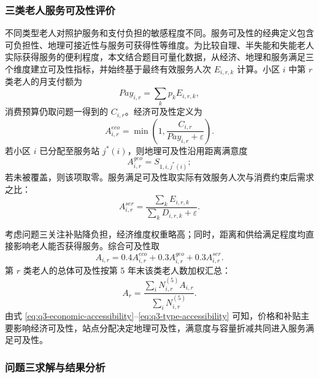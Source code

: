 \subsubsection{三类老人服务可及性评价}

不同类型老人对照护服务和支付负担的敏感程度不同。服务可及性的经典定义包含可负担性、地理可接近性与服务可获得性等维度\cite{penchansky1981}。为比较自理、半失能和失能老人实际获得服务的便利程度，本文结合题目可量化数据，从经济、地理和服务满足三个维度建立可及性指标，并始终基于最终有效服务人次 $E_{i,r,k}$ 计算。小区 $i$ 中第 $r$ 类老人的月支付额为
\begin{equation}
  Pay_{i,r}
  =
  \sum_kp_kE_{i,r,k},
  \label{eq:q3-monthly-pay}
\end{equation}
消费预算仍取问题一得到的 $C_{i,r}$。经济可及性定义为
\begin{equation}
  A_{i,r}^{eco}
  =
  \min\left(
    1,\frac{C_{i,r}}{Pay_{i,r}+\varepsilon}
  \right).
  \label{eq:q3-economic-accessibility}
\end{equation}
若小区 $i$ 已分配至服务站 $j^*(i)$，则地理可及性沿用距离满意度
\begin{equation}
  A_{i,r}^{geo}=S_{1,i,j^*(i)};
  \label{eq:q3-geographic-accessibility}
\end{equation}
若未被覆盖，则该项取零。服务满足可及性取实际有效服务人次与消费约束后需求之比：
\begin{equation}
  A_{i,r}^{ser}
  =
  \frac{\sum_kE_{i,r,k}}
  {\sum_kD_{i,r,k}+\varepsilon}.
  \label{eq:q3-service-accessibility}
\end{equation}

考虑问题三关注补贴降负担，经济维度权重略高；同时，距离和供给满足程度均直接影响老人能否获得服务。综合可及性取
\begin{equation}
  A_{i,r}
  =
  0.4A_{i,r}^{eco}
  +0.3A_{i,r}^{geo}
  +0.3A_{i,r}^{ser}.
  \label{eq:q3-overall-accessibility}
\end{equation}
第 $r$ 类老人的总体可及性按第 5 年末该类老人数加权汇总：
\begin{equation}
  A_r
  =
  \frac{\sum_iN_{i,r}^{(5)}A_{i,r}}
  {\sum_iN_{i,r}^{(5)}}.
  \label{eq:q3-type-accessibility}
\end{equation}
由式 \eqref{eq:q3-economic-accessibility}--\eqref{eq:q3-type-accessibility} 可知，价格和补贴主要影响经济可及性，站点分配决定地理可及性，满意度与容量折减共同进入服务满足可及性。

\subsubsection{问题三求解与结果分析}

